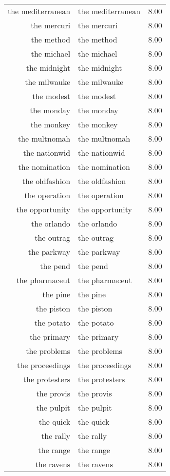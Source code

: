 \begin{table}[ht]
\begin{tabular}{rlr}
  the mediterranean & the mediterranean & 8.00 \\ 
  the mercuri & the mercuri & 8.00 \\ 
  the method & the method & 8.00 \\ 
  the michael & the michael & 8.00 \\ 
  the midnight & the midnight & 8.00 \\ 
  the milwauke & the milwauke & 8.00 \\ 
  the modest & the modest & 8.00 \\ 
  the monday & the monday & 8.00 \\ 
  the monkey & the monkey & 8.00 \\ 
  the multnomah & the multnomah & 8.00 \\ 
  the nationwid & the nationwid & 8.00 \\ 
  the nomination & the nomination & 8.00 \\ 
  the oldfashion & the oldfashion & 8.00 \\ 
  the operation & the operation & 8.00 \\ 
  the opportunity & the opportunity & 8.00 \\ 
  the orlando & the orlando & 8.00 \\ 
  the outrag & the outrag & 8.00 \\ 
  the parkway & the parkway & 8.00 \\ 
  the pend & the pend & 8.00 \\ 
  the pharmaceut & the pharmaceut & 8.00 \\ 
  the pine & the pine & 8.00 \\ 
  the piston & the piston & 8.00 \\ 
  the potato & the potato & 8.00 \\ 
  the primary & the primary & 8.00 \\ 
  the problems & the problems & 8.00 \\ 
  the proceedings & the proceedings & 8.00 \\ 
  the protesters & the protesters & 8.00 \\ 
  the provis & the provis & 8.00 \\ 
  the pulpit & the pulpit & 8.00 \\ 
  the quick & the quick & 8.00 \\ 
  the rally & the rally & 8.00 \\ 
  the range & the range & 8.00 \\ 
  the ravens & the ravens & 8.00 \\ 

\end{tabular}
\end{table}
